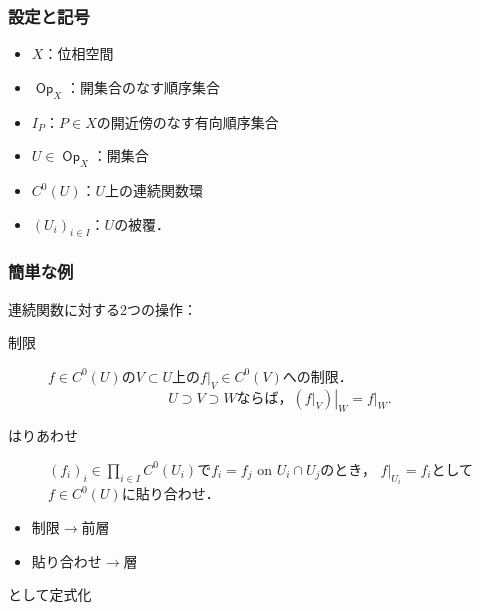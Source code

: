 \documentclass[dvipdfmx,12pt,aspectratio=169,leqno]{beamer}%
\numberwithin{equation}{subsection}
\newcommand{\Op}{\mathop{\textsf{Op}}\nolimits}
\theoremstyle{mystyle}
\begin{document}
\begin{frame}
    \frametitle{設定と記号}
    \begin{itemize}
        \item \(X\)：位相空間
        \item \(\Op_{X}\)：開集合のなす順序集合
        \item \(I_P\)：\(P\in X\)の開近傍のなす有向順序集合
        \item \(U\in \Op_{X}\)：開集合
        \item \(C^0(U)\)：\(U\)上の連続関数環
        \item \((U_i)_{i\in I}\)：\(U\)の被覆．
    \end{itemize}
\end{frame}

\begin{frame}
    \frametitle{簡単な例}

    連続関数に対する2つの操作：
    \begin{description}
        \item[制限]\(f\in C^0(U)\)の\(V\subset U\)上の\(f\rvert_V\in C^0(V)\)への制限．
        \[
            \text{\(U\supset V\supset W\)ならば，}
            \left.({f\rvert_V})\right\rvert_W=f\rvert_W.
        \]
        \item[はりあわせ]
        \((f_i)_{i}\in\prod_{i\in I}^{}C^{0}(U_i)\)で\(f_i=f_j\) on \(U_i\cap U_j\)のとき，
        \(f\rvert_{U_i}=f_i\)として\(f\in C^{0}(U)\)に貼り合わせ．
    \end{description}

    \bigskip
    \begin{itemize}
        \item 制限\(\to\)前層
        \item 貼り合わせ\(\to\)層
    \end{itemize}
    として定式化
\end{frame}
\end{document}
